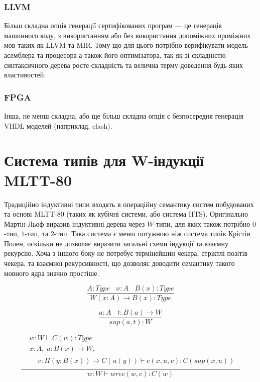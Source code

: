 \subsubsection{LLVM}
Більш складна опція генерації сертифікованих програм --- це генерація машинного коду,
з використанням або без використання допоміжних проміжних мов таких як LLVM та MIR.
Тому що для цього потрібно верифікувати модель асемблера та процесора а також
його оптимізатора, так як зі складністю синтаксичного дерева росте складність
та велична терму-доведення будь-яких властивостей.

\subsubsection{FPGA}
Інша, не менш складна, або ще більш складна опція є безпосередня генерація
VHDL моделей (наприклад, clash).

\newpage
\section{Система типів для W-індукції MLTT-80}
Традиційно індуктивні типи входять в операційну семантику систем побудованих
та основі MLTT-80 (таких як кубічні системи, або система HTS).
Оригінально Мартін-Льоф виразив індуктивні дерева через $W$-типи, для яких
також потрібно $0$-тип, $1$-тип, та $2$-тип. Така система є менш потужною ніж система типів Крістін Полен,
оскільки не дозволяє виразити загальні схеми індукції та взаємну рекурсію. Хоча з іншого
боку не потребує термінейшин чекера, стріктлі позітів чекера, та взаємної рекурсивності,
що дозволяє доводити семантику такого мовного ядра значно простіше.

\begin{equation}
\tag{$W$-formation}
\dfrac
{A:Type\ \ \ \ x:A\ \ \ \ B(x):Type}
{W (x:A) \rightarrow B(x) : Type}
\end{equation}

\begin{equation}
\tag{$W$-intro}
\dfrac
{a:A\ \ \ \ t: B(a) \rightarrow W}
{sup(a,t) : W}
\end{equation}

\begin{equation}
\tag{$W$-elim}
\dfrac
  {\begin{aligned}
   & w: W \vdash C(w) : Type \\
   & x:A,\ u:B(x) \rightarrow W, \\
   & \begin{aligned}
     & v:\Pi (y:B(x)) \rightarrow C(u(y)) \vdash c(x,u,v):C(sup(x,u))
     \end{aligned}
   \end{aligned}}
  {w:W \vdash wrec(w,c):C(w)}
\end{equation}

